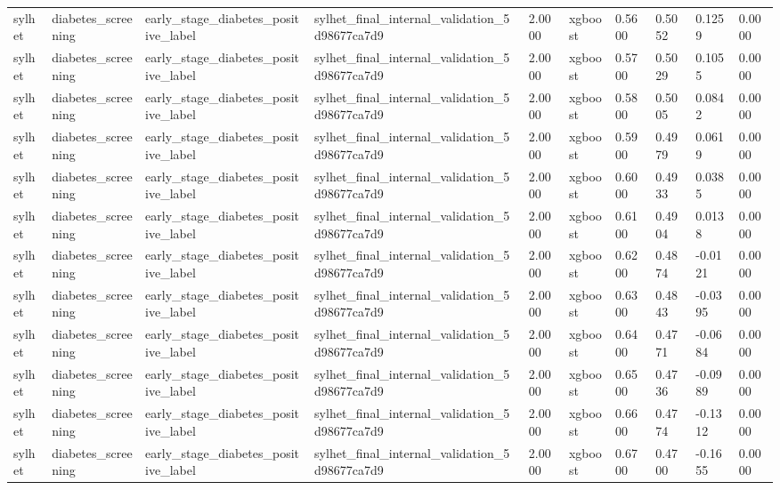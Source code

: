 \begin{tabular}{llllllllll}
sylhet & diabetes\_screening & early\_stage\_diabetes\_positive\_label & sylhet\_final\_internal\_validation\_5d98677ca7d9 & 2.0000 & xgboost & 0.5600 & 0.5052 & 0.1259 & 0.0000 \\
sylhet & diabetes\_screening & early\_stage\_diabetes\_positive\_label & sylhet\_final\_internal\_validation\_5d98677ca7d9 & 2.0000 & xgboost & 0.5700 & 0.5029 & 0.1055 & 0.0000 \\
sylhet & diabetes\_screening & early\_stage\_diabetes\_positive\_label & sylhet\_final\_internal\_validation\_5d98677ca7d9 & 2.0000 & xgboost & 0.5800 & 0.5005 & 0.0842 & 0.0000 \\
sylhet & diabetes\_screening & early\_stage\_diabetes\_positive\_label & sylhet\_final\_internal\_validation\_5d98677ca7d9 & 2.0000 & xgboost & 0.5900 & 0.4979 & 0.0619 & 0.0000 \\
sylhet & diabetes\_screening & early\_stage\_diabetes\_positive\_label & sylhet\_final\_internal\_validation\_5d98677ca7d9 & 2.0000 & xgboost & 0.6000 & 0.4933 & 0.0385 & 0.0000 \\
sylhet & diabetes\_screening & early\_stage\_diabetes\_positive\_label & sylhet\_final\_internal\_validation\_5d98677ca7d9 & 2.0000 & xgboost & 0.6100 & 0.4904 & 0.0138 & 0.0000 \\
sylhet & diabetes\_screening & early\_stage\_diabetes\_positive\_label & sylhet\_final\_internal\_validation\_5d98677ca7d9 & 2.0000 & xgboost & 0.6200 & 0.4874 & -0.0121 & 0.0000 \\
sylhet & diabetes\_screening & early\_stage\_diabetes\_positive\_label & sylhet\_final\_internal\_validation\_5d98677ca7d9 & 2.0000 & xgboost & 0.6300 & 0.4843 & -0.0395 & 0.0000 \\
sylhet & diabetes\_screening & early\_stage\_diabetes\_positive\_label & sylhet\_final\_internal\_validation\_5d98677ca7d9 & 2.0000 & xgboost & 0.6400 & 0.4771 & -0.0684 & 0.0000 \\
sylhet & diabetes\_screening & early\_stage\_diabetes\_positive\_label & sylhet\_final\_internal\_validation\_5d98677ca7d9 & 2.0000 & xgboost & 0.6500 & 0.4736 & -0.0989 & 0.0000 \\
sylhet & diabetes\_screening & early\_stage\_diabetes\_positive\_label & sylhet\_final\_internal\_validation\_5d98677ca7d9 & 2.0000 & xgboost & 0.6600 & 0.4774 & -0.1312 & 0.0000 \\
sylhet & diabetes\_screening & early\_stage\_diabetes\_positive\_label & sylhet\_final\_internal\_validation\_5d98677ca7d9 & 2.0000 & xgboost & 0.6700 & 0.4700 & -0.1655 & 0.0000 \\

\end{tabular}
